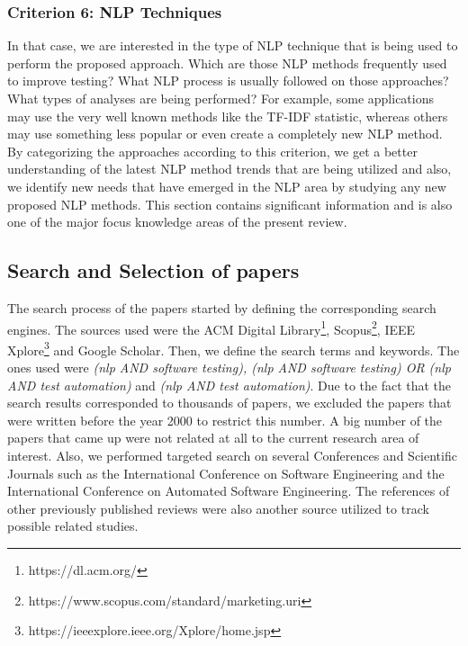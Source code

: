 \subsubsection* {Criterion 6: NLP Techniques}
In that case, we are interested in the type of NLP technique that is being used to perform the proposed approach. Which are those NLP methods frequently used to improve testing? What NLP process is usually 
followed on those approaches? What types of analyses are being performed? For example, some applications may use the very well known methods 
like the TF-IDF statistic, whereas others may use something less popular or even create a completely new NLP method. By categorizing the approaches 
according to this criterion, we get a better understanding of the latest NLP method trends that are being utilized and also, we identify new needs that have emerged in the 
NLP area by studying any new proposed NLP methods. This section contains significant information and is also one of the major focus knowledge areas of the present review.

\subsection {Search and Selection of papers}
The search process of the papers started by defining the corresponding search engines. The sources used were the ACM Digital Library\footnote{https://dl.acm.org/}, Scopus\footnote{https://www.scopus.com/standard/marketing.uri}, 
IEEE Xplore\footnote{https://ieeexplore.ieee.org/Xplore/home.jsp} and Google Scholar. Then, we define the search terms and keywords. The ones used were \emph{(nlp AND software testing), (nlp 
AND software testing) OR (nlp AND test automation)} and \emph{(nlp AND test automation)}. Due to the fact that the search results corresponded 
to thousands of papers, we excluded the papers that were written before the year 2000 to restrict this number. A big number of the papers that came up 
were not related at all to the current research area of interest. Also, we performed targeted search on several Conferences and Scientific Journals such 
as the International Conference on Software Engineering and the International Conference on Automated Software Engineering. The references of other previously 
published reviews were also another source utilized to track possible related studies. \\

